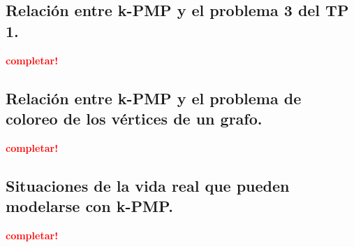 \subsection{Relación entre k-PMP y el problema 3 del TP 1.}
\vspace*{0.3cm}
\textcolor{red}{\textbf{completar!}}



\newpage
\subsection{Relación entre k-PMP y el problema de coloreo de los vértices de
            un grafo.}
\vspace*{0.3cm}
\textcolor{red}{\textbf{completar!}}



\newpage
\subsection{Situaciones de la vida real que pueden modelarse con k-PMP.}
\vspace*{0.3cm}
\textcolor{red}{\textbf{completar!}}

